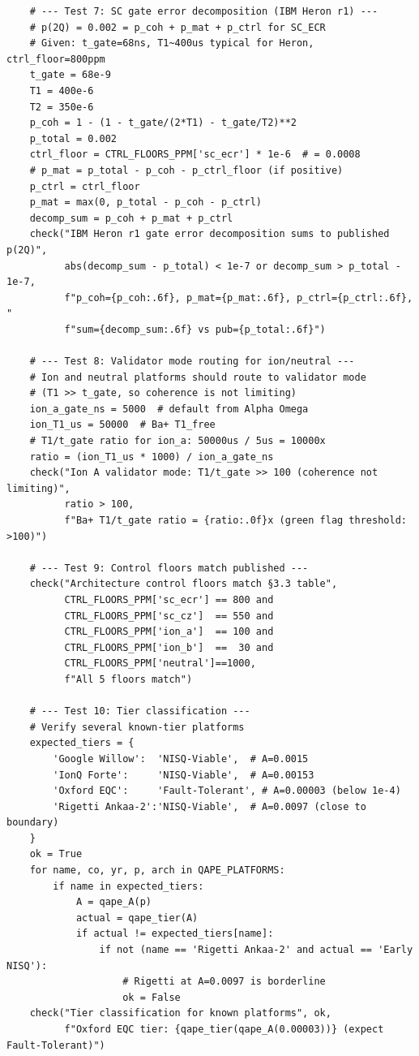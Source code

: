 \documentclass[12pt,a4paper]{article}
\begin{document}
\begin{verbatim}
    # --- Test 7: SC gate error decomposition (IBM Heron r1) ---
    # p(2Q) = 0.002 = p_coh + p_mat + p_ctrl for SC_ECR
    # Given: t_gate=68ns, T1~400us typical for Heron, ctrl_floor=800ppm
    t_gate = 68e-9
    T1 = 400e-6
    T2 = 350e-6
    p_coh = 1 - (1 - t_gate/(2*T1) - t_gate/T2)**2
    p_total = 0.002
    ctrl_floor = CTRL_FLOORS_PPM['sc_ecr'] * 1e-6  # = 0.0008
    # p_mat = p_total - p_coh - p_ctrl_floor (if positive)
    p_ctrl = ctrl_floor
    p_mat = max(0, p_total - p_coh - p_ctrl)
    decomp_sum = p_coh + p_mat + p_ctrl
    check("IBM Heron r1 gate error decomposition sums to published p(2Q)",
          abs(decomp_sum - p_total) < 1e-7 or decomp_sum > p_total - 1e-7,
          f"p_coh={p_coh:.6f}, p_mat={p_mat:.6f}, p_ctrl={p_ctrl:.6f}, "
          f"sum={decomp_sum:.6f} vs pub={p_total:.6f}")

    # --- Test 8: Validator mode routing for ion/neutral ---
    # Ion and neutral platforms should route to validator mode
    # (T1 >> t_gate, so coherence is not limiting)
    ion_a_gate_ns = 5000  # default from Alpha Omega
    ion_T1_us = 50000  # Ba+ T1_free
    # T1/t_gate ratio for ion_a: 50000us / 5us = 10000x
    ratio = (ion_T1_us * 1000) / ion_a_gate_ns
    check("Ion A validator mode: T1/t_gate >> 100 (coherence not limiting)",
          ratio > 100,
          f"Ba+ T1/t_gate ratio = {ratio:.0f}x (green flag threshold: >100)")

    # --- Test 9: Control floors match published ---
    check("Architecture control floors match §3.3 table",
          CTRL_FLOORS_PPM['sc_ecr'] == 800 and
          CTRL_FLOORS_PPM['sc_cz']  == 550 and
          CTRL_FLOORS_PPM['ion_a']  == 100 and
          CTRL_FLOORS_PPM['ion_b']  ==  30 and
          CTRL_FLOORS_PPM['neutral']==1000,
          f"All 5 floors match")

    # --- Test 10: Tier classification ---
    # Verify several known-tier platforms
    expected_tiers = {
        'Google Willow':  'NISQ-Viable',  # A=0.0015
        'IonQ Forte':     'NISQ-Viable',  # A=0.00153
        'Oxford EQC':     'Fault-Tolerant', # A=0.00003 (below 1e-4)
        'Rigetti Ankaa-2':'NISQ-Viable',  # A=0.0097 (close to boundary)
    }
    ok = True
    for name, co, yr, p, arch in QAPE_PLATFORMS:
        if name in expected_tiers:
            A = qape_A(p)
            actual = qape_tier(A)
            if actual != expected_tiers[name]:
                if not (name == 'Rigetti Ankaa-2' and actual == 'Early NISQ'):
                    # Rigetti at A=0.0097 is borderline
                    ok = False
    check("Tier classification for known platforms", ok,
          f"Oxford EQC tier: {qape_tier(qape_A(0.00003))} (expect Fault-Tolerant)")


\end{verbatim}
\end{document}
